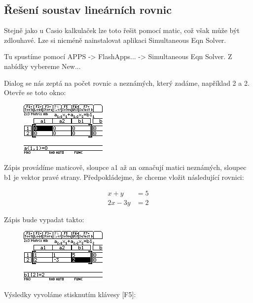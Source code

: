 \documentclass[10pt,a4paper,float]{article}
\begin{document}
\subsection{Řešení soustav lineárních rovnic}
\label{ssec:linsoustavy}
Stejně jako u Casio kalkulaček lze toto řešit pomocí matic, což však může být zdlouhavé. Lze si nicméně nainstalovat aplikaci Simultaneous Eqn Solver.

Tu spustíme pomocí APPS -> FlashApps... -> Simultaneous Eqn Solver. Z nabídky vybereme New...

Dialog se nás zeptá na počet rovnic a neznámých, který zadáme, například 2 a 2. Otevře se toto okno:

\begin{figure}[H]
	\centering
	\includegraphics[width=.5\textwidth]{img/SYSEQ1}
\end{figure}

Zápis provádíme maticově, sloupce a1 až an označují matici neznámých, sloupec b1 je vektor pravé strany. Předpokládejme, že chceme vložit následující rovnici:

\begin{align*}
	x + y &= 5\\
	2x - 3y &= 2
\end{align*}

Zápis bude vypadat takto:

\begin{figure}[H]
	\centering
	\includegraphics[width=.5\textwidth]{img/SYSEQ2}
\end{figure}

\pagebreak

Výsledky vyvoláme stisknutím klávesy [F5]:
\end{document}
